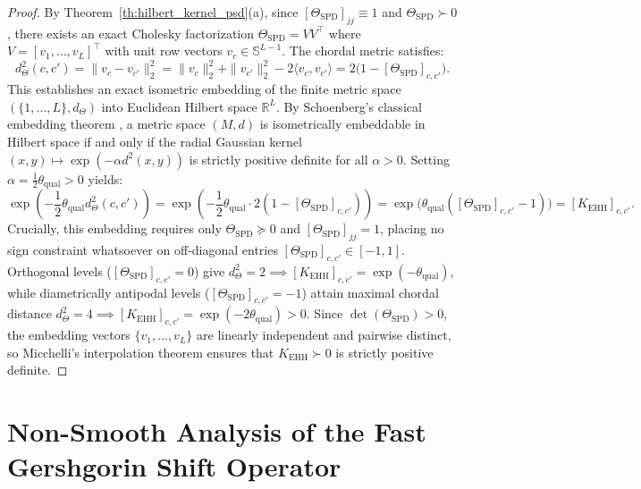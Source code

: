 \documentclass[default,sn-mathphys,Numbered]{sn-jnl}
\theoremstyle{thmstyleone}
\theoremstyle{thmstylethree}
\theoremstyle{thmstyletwo}
\begin{document}
\begin{appendices}
\begin{proof}
By Theorem~\ref{th:hilbert_kernel_psd}(a), since $[\Theta_{\mathrm{SPD}}]_{jj} \equiv 1$ and $\Theta_{\mathrm{SPD}} \succ 0$, there exists an exact Cholesky factorization $\Theta_{\mathrm{SPD}} = V V^\top$ where $V = [v_1, \dots, v_L]^\top$ with unit row vectors $v_c \in \mathbb{S}^{L-1}$. The chordal metric satisfies:
\begin{equation}
d_\Theta^2(c, c') = \|v_c - v_{c'}\|_2^2 = \|v_c\|_2^2 + \|v_{c'}\|_2^2 - 2 \langle v_c, v_{c'} \rangle = 2\bigl(1 - [\Theta_{\mathrm{SPD}}]_{c, c'}\bigr).
\end{equation}
This establishes an exact isometric embedding of the finite metric space $(\{1, \dots, L\}, d_\Theta)$ into Euclidean Hilbert space $\mathbb{R}^L$. By Schoenberg's classical embedding theorem \citep[Theorem~1]{schoenberg1938metric}, a metric space $(M, d)$ is isometrically embeddable in Hilbert space if and only if the radial Gaussian kernel $(x, y) \mapsto \exp(-\alpha d^2(x, y))$ is strictly positive definite for all $\alpha > 0$.
Setting $\alpha = \frac{1}{2} \theta_{\mathrm{qual}} > 0$ yields:
\begin{equation}
\exp\left(-\frac{1}{2}\theta_{\mathrm{qual}} d_\Theta^2(c, c')\right) = \exp\left(-\frac{1}{2}\theta_{\mathrm{qual}} \cdot 2(1 - [\Theta_{\mathrm{SPD}}]_{c, c'})\right) = \exp\bigl(\theta_{\mathrm{qual}}([\Theta_{\mathrm{SPD}}]_{c, c'} - 1)\bigr) = [K_{\mathrm{EHH}}]_{c, c'}.
\end{equation}
Crucially, this embedding requires only $\Theta_{\mathrm{SPD}} \succeq 0$ and $[\Theta_{\mathrm{SPD}}]_{jj} = 1$, placing no sign constraint whatsoever on off-diagonal entries $[\Theta_{\mathrm{SPD}}]_{c, c'} \in [-1, 1]$.
Orthogonal levels ($[\Theta_{\mathrm{SPD}}]_{c, c'} = 0$) give $d_\Theta^2 = 2 \implies [K_{\mathrm{EHH}}]_{c, c'} = \exp(-\theta_{\mathrm{qual}})$, while diametrically antipodal levels ($[\Theta_{\mathrm{SPD}}]_{c, c'} = -1$) attain maximal chordal distance $d_\Theta^2 = 4 \implies [K_{\mathrm{EHH}}]_{c, c'} = \exp(-2\theta_{\mathrm{qual}}) > 0$. Since $\det(\Theta_{\mathrm{SPD}}) > 0$, the embedding vectors $\{v_1, \dots, v_L\}$ are linearly independent and pairwise distinct, so Micchelli's interpolation theorem \citep{micchelli1986interpolation} ensures that $K_{\mathrm{EHH}} \succ 0$ is strictly positive definite.
\end{proof}

\section{Non-Smooth Analysis of the Fast Gershgorin Shift Operator}
\label{sec:appendix_nonsmooth}


\end{appendices}
\end{document}
